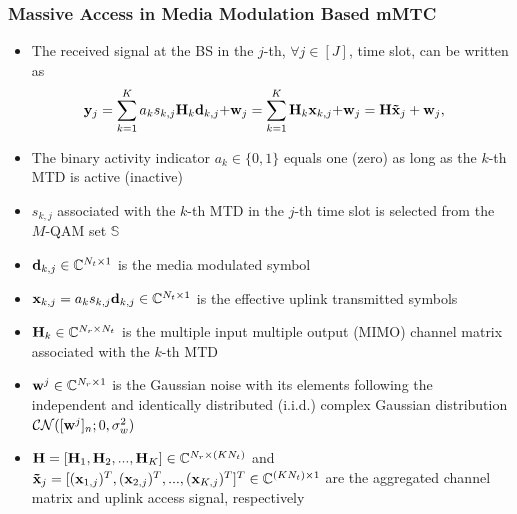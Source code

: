 \documentclass[9pt]{beamer}
\begin{document}
\begin{frame}
\frametitle{Massive Access in Media Modulation Based mMTC}

\begin{itemize}
\item
The received signal at the BS in the $j$-th, $\forall j\in [J]$, time slot, can be written as
\begin{equation}\label{eq:system}
\begin{split}
{{\bf{y}}_{j}}&=\sum\limits_{k = 1}^K a_ks_{k,j}{{\bf{H}}_k{{\bf{d}}_{k,j}} + } {{\bf{w}}_{j}}
=\sum\limits_{k = 1}^K {{\bf{H}}_k{{\bf{x}}_{k,j}} + } {{\bf{w}}_{j}}
={\bf{{{H}}}}{{\bf{{\tilde{x}}}}_{j}} +  {{\bf{w}}_{j}},
\end{split}
\end{equation}
\item
The binary activity indicator $a_k\in\{0,1\}$ equals one (zero) as long as the $k$-th MTD is active (inactive)
\item
$s_{k,j}$ associated with the $k$-th MTD in the $j$-th time slot is selected from the $M$-QAM set $\mathbb{S}$
\item
${\bf d}_{k,j}\in\mathbb{C}^{N_t \times 1}$ is the media modulated symbol
\item
${\bf{x}}_{k,j}=a_k{s_{k,j}}{\bf d}_{k,j}\in\mathbb{C}^{N_t \times 1}$ is the effective uplink transmitted symbols
\item
${\bf{H}}_k\in\mathbb{C}^{N_r\times N_t}$ is the multiple input multiple output (MIMO) channel matrix associated with the $k$-th MTD
\item
${\bf{w}}^{j} \in \mathbb{C}^{N_r \times 1}$ is the Gaussian noise with its elements following the independent and identically distributed (i.i.d.) complex Gaussian distribution $\mathcal{CN}([{\bf{w}}^{j}]_n;0,\sigma_w^2)$
\item
${{\bf{ H}}} = [{\bf H} _1, {\bf H} _2,...,{\bf H} _K] \in \mathbb{C}^{N_r \times (K N_t)}$ and ${{\bf{\tilde x}}_{j} } = [({\bf x}_{1,j})^{ T},({\bf x}_{2,j})^{ T},...,({\bf x}_{K,j})^{ T}]^{ T} \in \mathbb{C}^{(K N_t) \times 1}$ are the aggregated channel matrix and uplink access signal, respectively

\end{itemize}
\end{frame}
\end{document}
